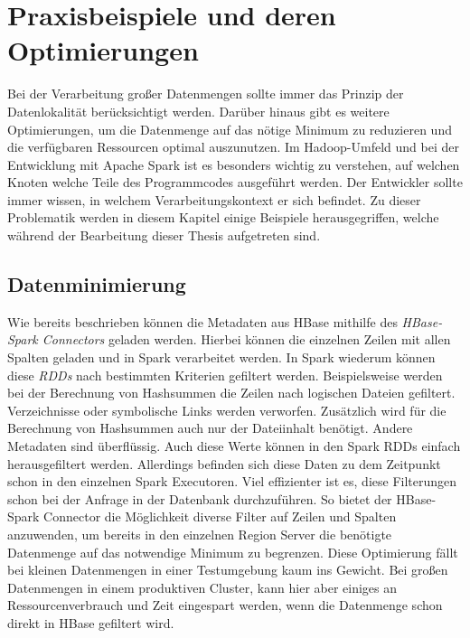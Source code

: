\section{Praxisbeispiele und deren Optimierungen}
Bei der Verarbeitung großer Datenmengen sollte immer das Prinzip der Datenlokalität berücksichtigt werden. Darüber hinaus gibt es weitere Optimierungen, um die Datenmenge auf das nötige Minimum zu reduzieren und die verfügbaren Ressourcen optimal auszunutzen. Im Hadoop-Umfeld und bei der Entwicklung mit Apache Spark ist es besonders wichtig zu verstehen, auf welchen Knoten welche Teile des Programmcodes ausgeführt werden. Der Entwickler sollte immer wissen, in welchem Verarbeitungskontext er sich befindet. Zu dieser Problematik werden in diesem Kapitel einige Beispiele herausgegriffen, welche während der Bearbeitung dieser Thesis aufgetreten sind.\\

\subsection*{Datenminimierung}
Wie bereits beschrieben können die Metadaten aus HBase mithilfe des \textit{HBase-Spark Connectors} geladen werden. Hierbei können die einzelnen Zeilen mit allen Spalten geladen und in Spark verarbeitet werden. In Spark wiederum können diese \textit{RDDs} nach bestimmten Kriterien gefiltert werden. Beispielsweise werden bei der Berechnung von Hashsummen die Zeilen nach logischen Dateien gefiltert. Verzeichnisse oder symbolische Links werden verworfen. Zusätzlich wird für die Berechnung von Hashsummen auch nur der Dateiinhalt benötigt. Andere Metadaten sind überflüssig. Auch diese Werte können in den Spark RDDs einfach herausgefiltert werden. Allerdings befinden sich diese Daten zu dem Zeitpunkt schon in den einzelnen Spark Executoren. Viel effizienter ist es, diese Filterungen schon bei der Anfrage in der Datenbank durchzuführen. So bietet der HBase-Spark Connector die Möglichkeit diverse Filter auf Zeilen und Spalten anzuwenden, um bereits in den einzelnen Region Server die benötigte Datenmenge auf das notwendige Minimum zu begrenzen. Diese Optimierung fällt bei kleinen Datenmengen in einer Testumgebung kaum ins Gewicht. Bei großen Datenmengen in einem produktiven Cluster, kann hier aber einiges an Ressourcenverbrauch und Zeit eingespart werden, wenn die Datenmenge schon direkt in HBase gefiltert wird.\\

